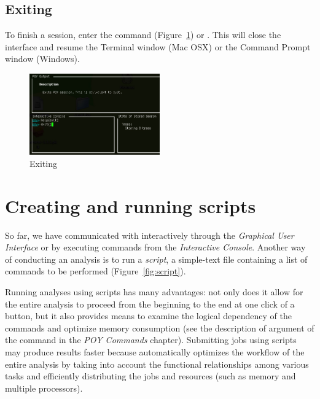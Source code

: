 \subsection{Exiting}
To finish a \poy session, enter the command  (Figure~\ref{fig:exithelp}) or . This will close the \poy interface and resume the Terminal window (Mac OSX) or the Command Prompt window (Windows).

\begin{figure}[]
    \begin{center}
        \includegraphics[width=0.5\textwidth]{figures/exithelp.jpg}
    \end{center}
    \caption{Exiting \poy}
    \label{fig:exithelp}
\end{figure}

\section{Creating and running \poy scripts}

So far, we have communicated with \poy interactively through the \emph{Graphical User Interface} or by executing commands from the \emph{Interactive Console}. Another way of conducting an analysis is to run a \emph{script}, a simple-text file containing a list of commands to be performed (Figure~\ref{fig:script}). 

Running analyses using scripts has many advantages: not only does it allow for the entire analysis to proceed from the beginning to the end at one click of a button, but it also provides means to examine the logical dependency of the commands and optimize memory consumption (see the description of  argument of the command  in the \emph{POY Commands} chapter). Submitting jobs using scripts may produce results faster because \poy automatically optimizes the workflow of the entire analysis by taking into account the functional relationships among various tasks and efficiently distributing the jobs and resources (such as memory and multiple processors).


